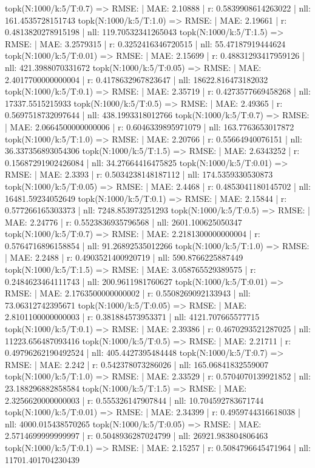 topk(N:1000/k:5/T:0.7) => RMSE: | MAE: 2.10888 | r: 0.5839908614263022 | nll: 161.4535728151743
topk(N:1000/k:5/T:1.0) => RMSE: | MAE: 2.19661 | r: 0.4813820278915198 | nll: 119.70532341265043
topk(N:1000/k:5/T:1.5) => RMSE: | MAE: 3.2579315 | r: 0.3252416346720515 | nll: 55.47187919444624
topk(N:1000/k:5/T:0.01) => RMSE: | MAE: 2.15699 | r: 0.48831293417959126 | nll: 421.3988070331672
topk(N:1000/k:5/T:0.05) => RMSE: | MAE: 2.4017700000000004 | r: 0.4178632967823647 | nll: 18622.816473182032
topk(N:1000/k:5/T:0.1) => RMSE: | MAE: 2.35719 | r: 0.4273577669458268 | nll: 17337.5515215933
topk(N:1000/k:5/T:0.5) => RMSE: | MAE: 2.49365 | r: 0.5697518732097644 | nll: 438.1993318012766
topk(N:1000/k:5/T:0.7) => RMSE: | MAE: 2.0664500000000006 | r: 0.6046339895971079 | nll: 163.7763653017872
topk(N:1000/k:5/T:1.0) => RMSE: | MAE: 2.20766 | r: 0.55664940076151 | nll: 36.337356893054306
topk(N:1000/k:5/T:1.5) => RMSE: | MAE: 2.6343252 | r: 0.15687291902426084 | nll: 34.27664416475825
topk(N:1000/k:5/T:0.01) => RMSE: | MAE: 2.3393 | r: 0.5034238148187112 | nll: 174.5359330530873
topk(N:1000/k:5/T:0.05) => RMSE: | MAE: 2.4468 | r: 0.4853041180145702 | nll: 16481.59234052649
topk(N:1000/k:5/T:0.1) => RMSE: | MAE: 2.15844 | r: 0.577266165303373 | nll: 7248.853973251293
topk(N:1000/k:5/T:0.5) => RMSE: | MAE: 2.24776 | r: 0.5523836935796568 | nll: 2601.100625050347
topk(N:1000/k:5/T:0.7) => RMSE: | MAE: 2.2181300000000004 | r: 0.5764716896158854 | nll: 91.26892535012266
topk(N:1000/k:5/T:1.0) => RMSE: | MAE: 2.2488 | r: 0.4903521400920719 | nll: 590.8766225887449
topk(N:1000/k:5/T:1.5) => RMSE: | MAE: 3.058765529389575 | r: 0.2484623464111743 | nll: 200.9611981760627
topk(N:1000/k:5/T:0.01) => RMSE: | MAE: 2.1763500000000002 | r: 0.5508269092133943 | nll: 73.06312742395671
topk(N:1000/k:5/T:0.05) => RMSE: | MAE: 2.8101100000000003 | r: 0.381884573953371 | nll: 4121.707665577715
topk(N:1000/k:5/T:0.1) => RMSE: | MAE: 2.39386 | r: 0.4670293521287025 | nll: 11223.656487093416
topk(N:1000/k:5/T:0.5) => RMSE: | MAE: 2.21711 | r: 0.49796262190492524 | nll: 405.4427395484448
topk(N:1000/k:5/T:0.7) => RMSE: | MAE: 2.242 | r: 0.542378073286026 | nll: 165.06841832559007
topk(N:1000/k:5/T:1.0) => RMSE: | MAE: 2.33529 | r: 0.5704070139921852 | nll: 23.188296882858584
topk(N:1000/k:5/T:1.5) => RMSE: | MAE: 2.3256620000000003 | r: 0.555326147907844 | nll: 10.704592783671744
topk(N:1000/k:5/T:0.01) => RMSE: | MAE: 2.34399 | r: 0.4959744316618038 | nll: 4000.015438570265
topk(N:1000/k:5/T:0.05) => RMSE: | MAE: 2.5714699999999997 | r: 0.5048936287024799 | nll: 26921.983804806463
topk(N:1000/k:5/T:0.1) => RMSE: | MAE: 2.15257 | r: 0.5084796645471964 | nll: 11701.401704230439
